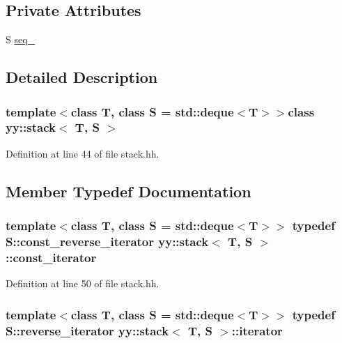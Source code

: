 \subsection*{Private Attributes}
\begin{DoxyCompactItemize}
\item 
S \hyperlink{classyy_1_1stack_ae0a9cbe8fb11651438de273ee7a6ef2e}{seq\_\-}
\end{DoxyCompactItemize}


\subsection{Detailed Description}
\subsubsection*{template$<$class T, class S = std::deque$<$T$>$$>$class yy::stack$<$ T, S $>$}



Definition at line 44 of file stack.hh.



\subsection{Member Typedef Documentation}
\hypertarget{classyy_1_1stack_a0cab3a74b0947ce6de68c3520b9229ab}{
\subsubsection[{const\_\-iterator}]{\setlength{\rightskip}{0pt plus 5cm}template$<$class T, class S = std::deque$<$T$>$$>$ typedef S::const\_\-reverse\_\-iterator {\bf yy::stack}$<$ T, S $>$::{\bf const\_\-iterator}}}
\label{classyy_1_1stack_a0cab3a74b0947ce6de68c3520b9229ab}


Definition at line 50 of file stack.hh.

\hypertarget{classyy_1_1stack_a959921144f243952520a2178121cbe6f}{
\subsubsection[{iterator}]{\setlength{\rightskip}{0pt plus 5cm}template$<$class T, class S = std::deque$<$T$>$$>$ typedef S::reverse\_\-iterator {\bf yy::stack}$<$ T, S $>$::{\bf iterator}}}
\label{classyy_1_1stack_a959921144f243952520a2178121cbe6f}


